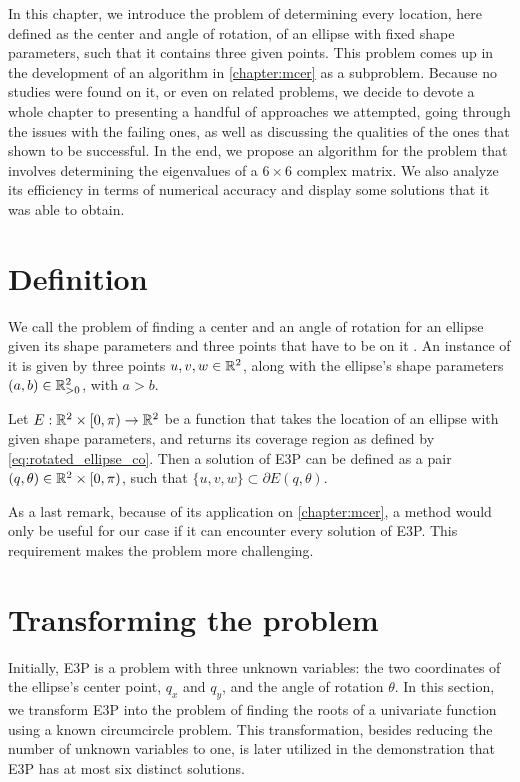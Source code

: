 In this chapter, we introduce the problem of determining every location, here defined as the center and angle of rotation, of an ellipse with fixed shape parameters, such that it contains three given points.
This problem comes up in the development of an algorithm in \autoref{chapter:mcer} as a subproblem. Because no studies were found on it, or even on related problems, we decide to devote a whole chapter to presenting a handful of approaches we attempted, going through the issues with the failing ones, as well as discussing the qualities of the ones that shown to be successful.
In the end, we propose an algorithm for the problem that involves determining the eigenvalues of a $6\times6$ complex matrix. We also analyze its efficiency in terms of numerical accuracy and display some solutions that it was able to obtain.


\section{Definition}

We call the problem of finding a center and an angle of rotation for an ellipse given its shape parameters and three points that have to be on it . An instance of it is given by three points $u, v, w \in \mathbb{R}^2$, along with the ellipse's shape parameters $(a, b) \in \mathbb{R}^2_{>0}$, with $a > b$.

Let $E: \mathbb{R}^2\times[0, \pi) \to \mathbb{R}^2$ be a function that takes the location of an ellipse with given shape parameters, and returns its coverage region as defined by \autoref{eq:rotated_ellipse_co}.
Then a solution of E3P can be defined as a pair $(q, \theta) \in \mathbb{R}^2\times[0, \pi)$, such that $\{u, v, w\} \subset \partial E(q, \theta)$. 

As a last remark, because of its application on \autoref{chapter:mcer}, a method would only be useful for our case if it can encounter every solution of E3P. This requirement makes the problem more challenging.

\section{Transforming the problem}\label{section:transforming-the-problem}

Initially, E3P is a problem with three unknown variables: the two coordinates of the ellipse's center point, $q_x$ and $q_y$, and the angle of rotation $\theta$. In this section, we transform E3P into the problem of finding the roots of a univariate function using a known circumcircle problem. 
This transformation, besides reducing the number of unknown variables to one, is later utilized in the demonstration that E3P has at most six distinct solutions.

